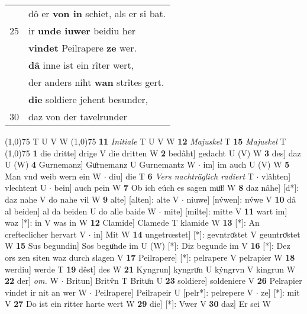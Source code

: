 \documentclass[8pt,a4paper,notitlepage]{article}
\begin{document}
\begin{table}[ht]
\begin{minipage}[t]{0.5\linewidth}
\begin{tabular}{rl}
 & dô er \textbf{von in} schiet, als er si bat.\\ 
25 & ir \textbf{unde iuwer} beidiu her\\ 
 & \textbf{vindet} Peilrapere \textbf{ze} wer.\\ 
 & \textbf{dâ} inne ist ein rîter wert,\\ 
 & der anders niht \textbf{wan} strîtes gert.\\ 
 & \textbf{die} soldiere jehent besunder,\\ 
30 & daz von der tavelrunder\\ 
\end{tabular}
\scriptsize
\line(1,0){75} \newline
T U V W \newline
\line(1,0){75} \newline
\textbf{11} \textit{Initiale} T U V W  \textbf{12} \textit{Majuskel} T  \textbf{15} \textit{Majuskel} T  \newline
\line(1,0){75} \newline
\textbf{1} die dritte] drige V die dritten W \textbf{2} bedâht] gedacht U (V) W \textbf{3} des] daz U (W) \textbf{4} Gurnemanz] Guͦrnemanz U Gurnemantz W  $\cdot$ im] im auch U (V) W \textbf{5} Man vnd weib wern ein W  $\cdot$ diu] die T \textbf{6} \textit{Vers nachträglich radiert} T   $\cdot$ vlâhten] vlechtent U  $\cdot$ bein] auch pein W \textbf{7} Ob ich eúch es sagen muͦß W \textbf{8} daz nâhe] [d*]: daz nahe V do nahe vil W \textbf{9} alte] [alten]: alte V  $\cdot$ niuwe] [nv́wen]: nv́we V \textbf{10} dâ al beiden] al da beiden U do alle baide W  $\cdot$ mite] [milte]: mitte V \textbf{11} wart im] waz [*]: in V was in W \textbf{12} Clamide] Clamede T klamide W \textbf{13} [*]: An crefteclicher hervart V  $\cdot$ in] Mit W \textbf{14} ungetrœstet] [*]: gevntroͤstet V geuntroͤstet W \textbf{15} Sus begundin] Sos beguͦnde im U (W) [*]: Diz begunde im  V \textbf{16} [*]: Dez ors zen siten waz durch slagen V \textbf{17} Peilrapere] [*]: pelrapere V pelrapier W \textbf{18} werdiu] werde T \textbf{19} dêst] des W \textbf{21} Kyngrun] kyngruͦn U kẏngrvn V kingrun W \textbf{22} der] \textit{om.} W  $\cdot$ Britun] Britv̂n T Brituͦn U \textbf{23} soldiere] soldeniere V \textbf{26} Pelrapier vindet ir nit an wer W  $\cdot$ Peilrapere] Peilrapeir U [pelr*]: pelrepere V  $\cdot$ ze] [*]: mit V \textbf{27} Do ist ein ritter harte wert W \textbf{29} die] [*]: Vwer V \textbf{30} daz] Er sei W \newline
\end{minipage}
\end{table}
\end{document}
